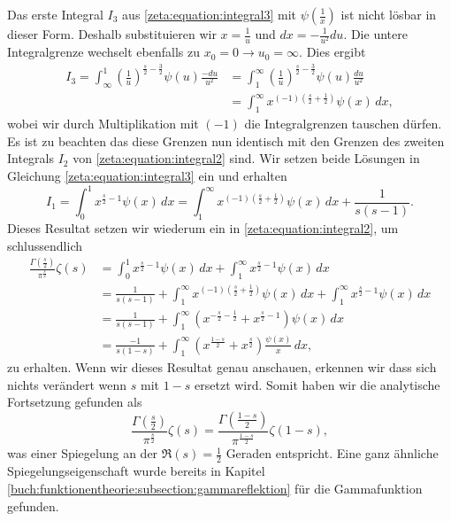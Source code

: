 Das erste Integral $I_3$ aus \eqref{zeta:equation:integral3} mit $\psi \left(\frac{1}{x} \right)$ ist nicht lösbar in dieser Form.
Deshalb substituieren wir $x = \frac{1}{u}$ und $dx = -\frac{1}{u^2}du$.
Die untere Integralgrenze wechselt ebenfalls zu $x_0 = 0 \rightarrow u_0 = \infty$.
Dies ergibt
\begin{align}
    I_3
    =
    \int_{\infty}^{1}
    \left(
    \frac{1}{u}
    \right)^{\frac{s}{2}-\frac{3}{2}}
    \psi(u)
    \frac{-du}{u^2}
    &=
    \int_{1}^{\infty}
    \left(
    \frac{1}{u}
    \right)^{\frac{s}{2}-\frac{3}{2}}
    \psi(u)
    \frac{du}{u^2}
    \\
    &=
    \int_{1}^{\infty}
    x^{(-1) \left(\frac{s}{2}+\frac{1}{2}\right)}
    \psi(x)
    \,dx,
\end{align}
wobei wir durch Multiplikation mit $(-1)$ die Integralgrenzen tauschen dürfen.
Es ist zu beachten das diese Grenzen nun identisch mit den Grenzen des zweiten Integrals $I_2$ von \eqref{zeta:equation:integral2} sind.
Wir setzen beide Lösungen in Gleichung \eqref{zeta:equation:integral3} ein und erhalten
\begin{equation}
    I_1
    =
    \int_0^{1}
    x^{\frac{s}{2}-1}
    \psi(x)
    \,dx
    =
    \int_{1}^{\infty}
    x^{(-1) \left(\frac{s}{2}+\frac{1}{2}\right)}
    \psi(x)
    \,dx
    +
    \frac{1}{s(s-1)}.
\end{equation}
Dieses Resultat setzen wir wiederum ein in \eqref{zeta:equation:integral2}, um schlussendlich
\begin{align}
    \frac{\Gamma \left( \frac{s}{2} \right)}{\pi^{\frac{s}{2}}}
    \zeta(s)
    &=
    \int_0^{1}
    x^{\frac{s}{2}-1}
    \psi(x)
    \,dx
    +
    \int_1^{\infty}
    x^{\frac{s}{2}-1}
    \psi(x)
    \,dx
    \nonumber
    \\
    &=
    \frac{1}{s(s-1)}
    +
    \int_{1}^{\infty}
    x^{(-1) \left(\frac{s}{2}+\frac{1}{2}\right)}
    \psi(x)
    \,dx
    +
    \int_1^{\infty}
    x^{\frac{s}{2}-1}
    \psi(x)
    \,dx
    \\
    &=
    \frac{1}{s(s-1)}
    +
    \int_{1}^{\infty}
    \left(
    x^{-\frac{s}{2}-\frac{1}{2}}
    +
    x^{\frac{s}{2}-1}
    \right)
    \psi(x)
    \,dx
    \\
    &=
    \frac{-1}{s(1-s)}
    +
    \int_{1}^{\infty}
    \left(
    x^{\frac{1-s}{2}}
    +
    x^{\frac{s}{2}}
    \right)
    \frac{\psi(x)}{x}
    \,dx,
\end{align}
zu erhalten.
Wenn wir dieses Resultat genau anschauen, erkennen wir dass sich nichts verändert wenn $s$ mit $1-s$ ersetzt wird.
Somit haben wir die analytische Fortsetzung gefunden als
\begin{equation}\label{zeta:equation:functional}
    \frac{\Gamma \left( \frac{s}{2} \right)}{\pi^{\frac{s}{2}}}
    \zeta(s)
    =
    \frac{\Gamma \left( \frac{1-s}{2} \right)}{\pi^{\frac{1-s}{2}}}
    \zeta(1-s),
\end{equation}
was einer Spiegelung an der $\Re(s) = \frac{1}{2}$ Geraden entspricht.
Eine ganz ähnliche Spiegelungseigenschaft wurde bereits in Kapitel \ref{buch:funktionentheorie:subsection:gammareflektion} für die Gammafunktion gefunden.

